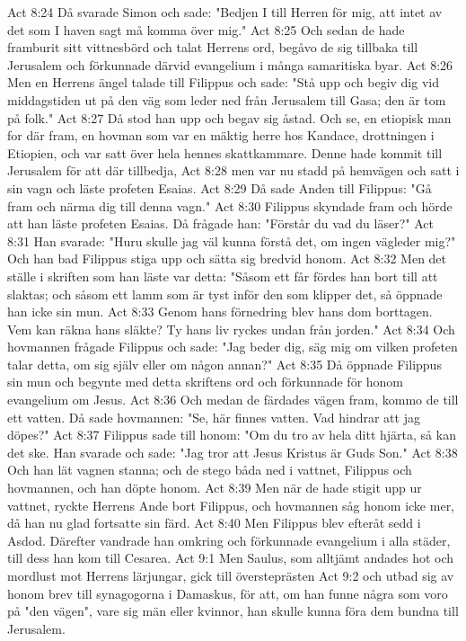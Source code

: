 Act 8:24  Då svarade Simon och sade: "Bedjen I till Herren för mig, att intet av det som I haven sagt må komma över mig."
Act 8:25  Och sedan de hade framburit sitt vittnesbörd och talat Herrens ord, begåvo de sig tillbaka till Jerusalem och förkunnade därvid evangelium i många samaritiska byar.
Act 8:26  Men en Herrens ängel talade till Filippus och sade: "Stå upp och begiv dig vid middagstiden ut på den väg som leder ned från Jerusalem till Gasa; den är tom på folk."
Act 8:27  Då stod han upp och begav sig åstad. Och se, en etiopisk man for där fram, en hovman som var en mäktig herre hos Kandace, drottningen i Etiopien, och var satt över hela hennes skattkammare. Denne hade kommit till Jerusalem för att där tillbedja,
Act 8:28  men var nu stadd på hemvägen och satt i sin vagn och läste profeten Esaias.
Act 8:29  Då sade Anden till Filippus: "Gå fram och närma dig till denna vagn."
Act 8:30  Filippus skyndade fram och hörde att han läste profeten Esaias. Då frågade han: "Förstår du vad du läser?"
Act 8:31  Han svarade: "Huru skulle jag väl kunna förstå det, om ingen vägleder mig?" Och han bad Filippus stiga upp och sätta sig bredvid honom.
Act 8:32  Men det ställe i skriften som han läste var detta: "Såsom ett får fördes han bort till att slaktas; och såsom ett lamm som är tyst inför den som klipper det, så öppnade han icke sin mun.
Act 8:33  Genom hans förnedring blev hans dom borttagen. Vem kan räkna hans släkte? Ty hans liv ryckes undan från jorden."
Act 8:34  Och hovmannen frågade Filippus och sade: "Jag beder dig, säg mig om vilken profeten talar detta, om sig själv eller om någon annan?"
Act 8:35  Då öppnade Filippus sin mun och begynte med detta skriftens ord och förkunnade för honom evangelium om Jesus.
Act 8:36  Och medan de färdades vägen fram, kommo de till ett vatten. Då sade hovmannen: "Se, här finnes vatten. Vad hindrar att jag döpes?"
Act 8:37  Filippus sade till honom: "Om du tro av hela ditt hjärta, så kan det ske. Han svarade och sade: "Jag tror att Jesus Kristus är Guds Son."
Act 8:38  Och han lät vagnen stanna; och de stego båda ned i vattnet, Filippus och hovmannen, och han döpte honom.
Act 8:39  Men när de hade stigit upp ur vattnet, ryckte Herrens Ande bort Filippus, och hovmannen såg honom icke mer, då han nu glad fortsatte sin färd.
Act 8:40  Men Filippus blev efteråt sedd i Asdod. Därefter vandrade han omkring och förkunnade evangelium i alla städer, till dess han kom till Cesarea.
Act 9:1  Men Saulus, som alltjämt andades hot och mordlust mot Herrens lärjungar, gick till översteprästen
Act 9:2  och utbad sig av honom brev till synagogorna i Damaskus, för att, om han funne några som voro på "den vägen", vare sig män eller kvinnor, han skulle kunna föra dem bundna till Jerusalem.
